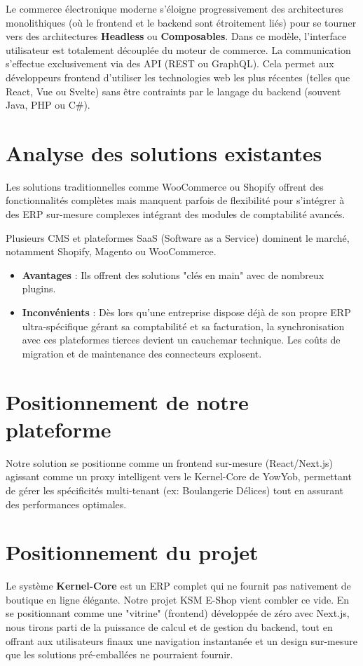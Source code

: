 \documentclass[12pt, a4paper]{report}
\begin{document}
Le commerce électronique moderne s'éloigne progressivement des architectures monolithiques (où le frontend et le backend sont étroitement liés) pour se tourner vers des architectures \textbf{Headless} ou \textbf{Composables}. Dans ce modèle, l'interface utilisateur est totalement découplée du moteur de commerce. La communication s'effectue exclusivement via des API (REST ou GraphQL). Cela permet aux développeurs frontend d'utiliser les technologies web les plus récentes (telles que React, Vue ou Svelte) sans être contraints par le langage du backend (souvent Java, PHP ou C\#).
\section{Analyse des solutions existantes}
Les solutions traditionnelles comme WooCommerce ou Shopify offrent des fonctionnalités complètes mais manquent parfois de flexibilité pour s'intégrer à des ERP sur-mesure complexes intégrant des modules de comptabilité avancés.

Plusieurs CMS et plateformes SaaS (Software as a Service) dominent le marché, notamment Shopify, Magento ou WooCommerce. 
\begin{itemize}
    \item \textbf{Avantages} : Ils offrent des solutions "clés en main" avec de nombreux plugins.
    \item \textbf{Inconvénients} : Dès lors qu'une entreprise dispose déjà de son propre ERP ultra-spécifique gérant sa comptabilité et sa facturation, la synchronisation avec ces plateformes tierces devient un cauchemar technique. Les coûts de migration et de maintenance des connecteurs explosent.
\end{itemize}
\section{Positionnement de notre plateforme}
Notre solution se positionne comme un frontend sur-mesure (React/Next.js) agissant comme un proxy intelligent vers le Kernel-Core de YowYob, permettant de gérer les spécificités multi-tenant (ex: Boulangerie Délices) tout en assurant des performances optimales.
\section{Positionnement du projet}
Le système \textbf{Kernel-Core} est un ERP complet qui ne fournit pas nativement de boutique en ligne élégante. Notre projet KSM E-Shop vient combler ce vide. En se positionnant comme une "vitrine" (frontend) développée de zéro avec Next.js, nous tirons parti de la puissance de calcul et de gestion du backend, tout en offrant aux utilisateurs finaux une navigation instantanée et un design sur-mesure que les solutions pré-emballées ne pourraient fournir.
\end{document}
